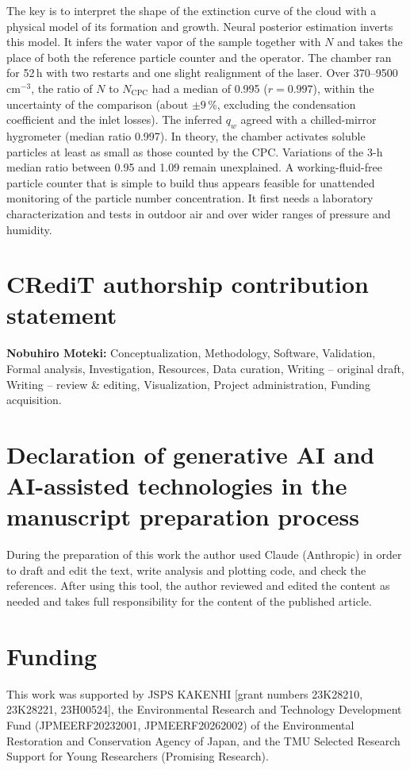 \documentclass[preprint,review,12pt,authoryear]{elsarticle}
\begin{document}
The key is to interpret the shape of the extinction curve of the cloud with a physical model of its
formation and growth. Neural posterior estimation inverts this model. It infers the water vapor of the
sample together with $N$ and takes the place of both the reference particle counter and the operator.
The chamber ran for 52\,h with two restarts and one slight realignment of the laser.
Over 370--9500\,cm$^{-3}$, the ratio of $N$ to $N_\mathrm{CPC}$ had a median of 0.995 ($r = 0.997$), within
the uncertainty of the comparison (about $\pm9$\,\%, excluding the condensation coefficient and the
inlet losses).
The inferred $q_w$ agreed with a chilled-mirror hygrometer (median ratio 0.997).
In theory, the chamber activates soluble particles at least as small as those counted by the CPC.
Variations of the 3-h median ratio between 0.95 and 1.09 remain unexplained.
A working-fluid-free particle counter that is simple to build
thus appears feasible for unattended monitoring of the particle number concentration. It first needs a
laboratory characterization and tests in outdoor air and over wider ranges of pressure and humidity.

\section*{CRediT authorship contribution statement}
\textbf{Nobuhiro Moteki:} Conceptualization, Methodology, Software, Validation, Formal analysis,
Investigation, Resources, Data curation, Writing -- original draft, Writing -- review \& editing,
Visualization, Project administration, Funding acquisition.

\section*{Declaration of generative AI and AI-assisted technologies in the manuscript preparation process}
During the preparation of this work the author used Claude (Anthropic) in order to draft and edit the
text, write analysis and plotting code, and check the references. After using this tool, the author
reviewed and edited the content as needed and takes full responsibility for the content of the
published article.

\section*{Funding}
This work was supported by JSPS KAKENHI [grant numbers 23K28210,
23K28221, 23H00524], the Environmental Research and Technology
Development Fund (JPMEERF20232001, JPMEERF20262002) of the Environmental Restoration
and Conservation Agency of Japan, and the TMU Selected Research
Support for Young Researchers (Promising Research).
\end{document}
